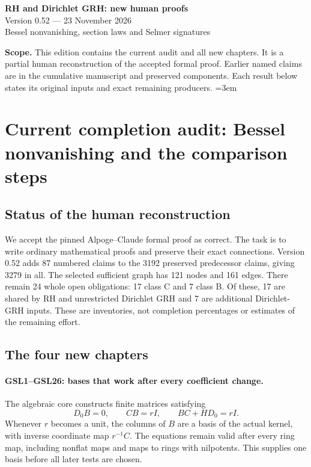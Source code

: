 \documentclass[11pt,a4paper]{article}
\numberwithin{equation}{section}
\theoremstyle{remark}\newtheorem{remark}[theorem]{Remark}
\begin{document}
\begin{center}
{\LARGE\bfseries RH and Dirichlet GRH: new human proofs}\\[7pt]
{\large Version 0.52 --- 23 November 2026}\\[5pt]
{\large Bessel nonvanishing, section laws and Selmer signatures}
\end{center}
\textbf{Scope.} This edition contains the current audit and all new chapters.
It is a partial human reconstruction of the accepted formal proof.
Earlier named claims are in the cumulative manuscript and preserved components.
Each result below states its original inputs and exact remaining producers.
\setcounter{tocdepth}{1}
\tableofcontents
\clearpage
\begingroup\emergencystretch=3em
\section{Current completion audit: Bessel nonvanishing and the comparison steps}
\label{sec:dependency-audit-v52}

\subsection{Status of the human reconstruction}

We accept the pinned Alpoge--Claude formal proof as correct. The task
is to write ordinary mathematical proofs and preserve their exact
connections. Version 0.52 adds 87 numbered claims to the 3192
preserved predecessor claims, giving 3279 in all. The selected
sufficient graph has 121 nodes and 161 edges. There remain 24
whole open obligations: 17 class C and 7 class B. Of these,
17 are shared by RH and unrestricted Dirichlet GRH and
7 are additional Dirichlet-GRH inputs. These are inventories,
not completion percentages or estimates of the remaining effort.

\subsection{The four new chapters}

\paragraph{GSL1--GSL26: bases that work after every coefficient change.}
The algebraic core constructs finite matrices satisfying
\[
 D_0B=0,\qquad CB=rI,\qquad BC+HD_0=rI.
\]
Whenever $r$ becomes a unit, the columns of $B$ are a basis of the
actual kernel, with inverse coordinate map $r^{-1}C$. The equations
remain valid after every ring map, including nonflat maps and maps
to rings with nilpotents. This supplies one basis before all later
tests are chosen.
\end{document}
